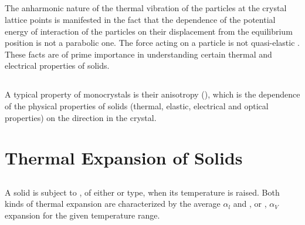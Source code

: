 \subsection{}\label{40.1.4} The anharmonic nature of the thermal vibration of the particles at the crystal lattice points  is manifested in the fact that the dependence of the potential energy of interaction of the
particles on their displacement from the equilibrium position is not a parabolic one. The force acting on a particle is not quasi-elastic . These facts are of prime importance in understanding certain thermal  and electrical  properties of solids.

\subsection{}\label{40.1.5} A typical property of monocrystals  is their anisotropy (), which is the dependence of the physical properties of solids (thermal, elastic, electrical and optical properties) on the direction in the crystal.

\section{Thermal Expansion of Solids}
\label{sec-40.2} 

\subsection{}\label{40.2.1} A solid is subject to , of either  or  type, when its temperature is raised. Both kinds of thermal expansion are characterized by the average  $\alpha_{l}$ and , or , $\alpha_{V}$ expansion for the given temperature range.

